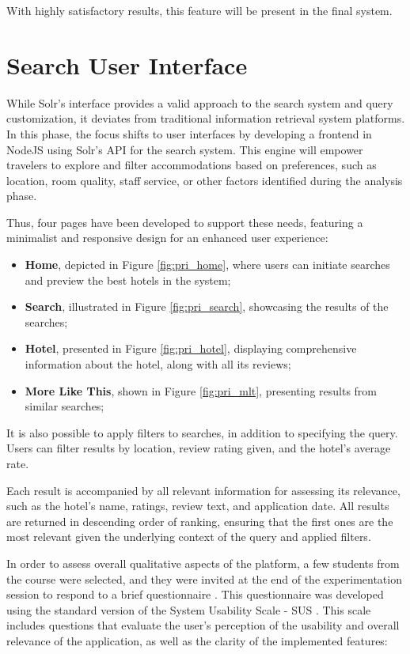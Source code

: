 \documentclass[sigconf]{acmart}
\begin{document}
With highly satisfactory results, this feature will be present in the final system.

\section{Search User Interface}

While Solr's interface provides a valid approach to the search system and query customization, it deviates from traditional information retrieval system platforms. In this phase, the focus shifts to user interfaces by developing a frontend in NodeJS \cite{NodeJS} using Solr's API \cite{Solr_api} for the search system. This engine will empower travelers to explore and filter accommodations based on preferences, such as location, room quality, staff service, or other factors identified during the analysis phase.

Thus, four pages have been developed to support these needs, featuring a minimalist and responsive design for an enhanced user experience:

\begin{itemize}
    \item \textbf{Home}, depicted in Figure \ref{fig:pri_home}, where users can initiate searches and preview the best hotels in the system;
    \item \textbf{Search}, illustrated in Figure \ref{fig:pri_search}, showcasing the results of the searches;
    \item \textbf{Hotel}, presented in Figure \ref{fig:pri_hotel}, displaying comprehensive information about the hotel, along with all its reviews;
    \item \textbf{More Like This}, shown in Figure \ref{fig:pri_mlt}, presenting results from similar searches;
\end{itemize}

It is also possible to apply filters to searches, in addition to specifying the query. Users can filter results by location, review rating given, and the hotel's average rate.

Each result is accompanied by all relevant information for assessing its relevance, such as the hotel's name, ratings, review text, and application date. All results are returned in descending order of ranking, ensuring that the first ones are the most relevant given the underlying context of the query and applied filters.

In order to assess overall qualitative aspects of the platform, a few students from the course were selected, and they were invited at the end of the experimentation session to respond to a brief questionnaire \cite{Sus_form}. This questionnaire was developed using the standard version of the System Usability Scale - SUS \cite{SUS}. This scale includes questions that evaluate the user's perception of the usability and overall relevance of the application, as well as the clarity of the implemented features:
\end{document}
